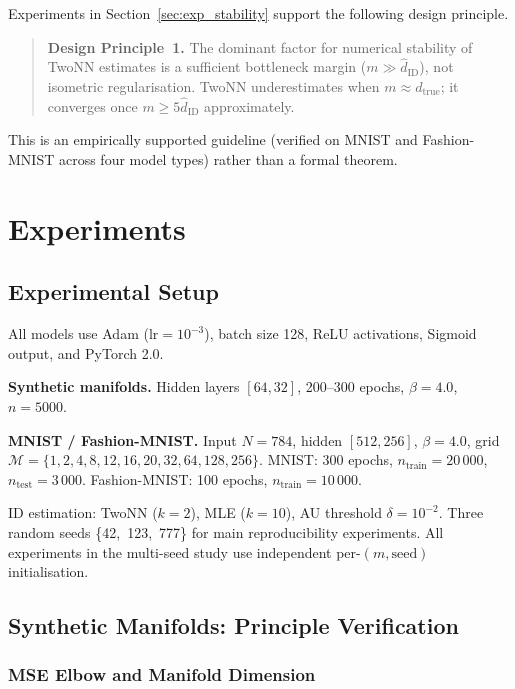 \documentclass[11pt,a4paper]{article}
\newcommand{\hatdID}{\hat{d}_{\mathrm{ID}}}
\begin{document}
Experiments in Section~\ref{sec:exp_stability} support the following design principle.

\begin{quote}
\textbf{Design Principle~1.}
The dominant factor for numerical stability of TwoNN estimates is a sufficient
bottleneck margin ($m\gg\hatdID$), not isometric regularisation.
TwoNN underestimates when $m\approx d_{\mathrm{true}}$; it converges once
$m\geq5\hatdID$ approximately.
\end{quote}

This is an empirically supported guideline (verified on MNIST and Fashion-MNIST
across four model types) rather than a formal theorem.

\section{Experiments}\label{sec:exp}

\subsection{Experimental Setup}\label{sec:exp_setup}

All models use Adam (lr$=10^{-3}$), batch size 128, ReLU activations,
Sigmoid output, and PyTorch 2.0.

\textbf{Synthetic manifolds.} Hidden layers $[64,32]$, 200--300 epochs,
$\beta=4.0$, $n=5000$.

\textbf{MNIST / Fashion-MNIST.} Input $N=784$, hidden $[512,256]$, $\beta=4.0$,
grid $\mathcal{M}=\{1,2,4,8,12,16,20,32,64,128,256\}$.
MNIST: 300 epochs, $n_{\mathrm{train}}=20\,000$, $n_{\mathrm{test}}=3\,000$.
Fashion-MNIST: 100 epochs, $n_{\mathrm{train}}=10\,000$.

ID estimation: TwoNN ($k=2$), MLE ($k=10$), AU threshold $\delta=10^{-2}$.
Three random seeds \{42,~123,~777\} for main reproducibility experiments.
All experiments in the multi-seed study use independent per-$(m,\text{seed})$
initialisation.

\subsection{Synthetic Manifolds: Principle Verification}\label{sec:exp_synthetic}

\subsubsection{MSE Elbow and Manifold Dimension}
\end{document}

